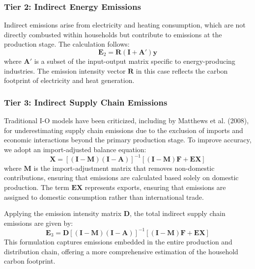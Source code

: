 \documentclass[12pt,a4paper]{article}%
\begin{document}
\subsubsection*{Tier 2: Indirect Energy Emissions}
Indirect emissions arise from electricity and heating consumption, which are not directly combusted within households but contribute to emissions at the production stage. The calculation follows:
\begin{equation}
    \mathbf{E}_2 = \mathbf{R} (\mathbf{I} + \mathbf{A}') \mathbf{y}
\end{equation}
where \( \mathbf{A}' \) is a subset of the input-output matrix specific to energy-producing industries. The emission intensity vector \( \mathbf{R} \) in this case reflects the carbon footprint of electricity and heat generation.

\subsubsection*{Tier 3: Indirect Supply Chain Emissions}
Traditional I-O models have been criticized, including by Matthews et al. (2008), for underestimating supply chain emissions due to the exclusion of imports and economic interactions beyond the primary production stage. To improve accuracy, we adopt an import-adjusted balance equation:
\begin{equation}
    \mathbf{X} = [(\mathbf{I} - \mathbf{M}) (\mathbf{I} - \mathbf{A})]^{-1} [(\mathbf{I} - \mathbf{M}) \mathbf{F} + \mathbf{EX}]
\end{equation}
where \( \mathbf{M} \) is the import-adjustment matrix that removes non-domestic contributions, ensuring that emissions are calculated based solely on domestic production. The term \( \mathbf{EX} \) represents exports, ensuring that emissions are assigned to domestic consumption rather than international trade.

Applying the emission intensity matrix \( \mathbf{D} \), the total indirect supply chain emissions are given by:
\begin{equation}
    \mathbf{E}_3 = \mathbf{D} [(\mathbf{I} - \mathbf{M}) (\mathbf{I} - \mathbf{A})]^{-1} [(\mathbf{I} - \mathbf{M}) \mathbf{F} + \mathbf{EX}]
\end{equation}
This formulation captures emissions embedded in the entire production and distribution chain, offering a more comprehensive estimation of the household carbon footprint.
\end{document}
